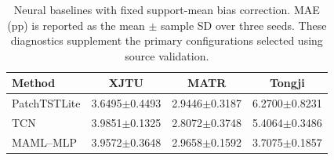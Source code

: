 \begin{table}[!htbp]\renewcommand{\arraystretch}{1.15}
\centering
\caption{Neural baselines with fixed support-mean bias correction. MAE (pp) is reported as the mean $\pm$ sample SD over three seeds. These diagnostics supplement the primary configurations selected using source validation.}
\label{tab:bias}
\papertablesize
\setlength{\tabcolsep}{4pt}
\begin{tabular}{lccc}
\toprule
Method & XJTU & MATR & Tongji \\
\midrule
PatchTSTLite & 3.6495$\pm$0.4493 & 2.9446$\pm$0.3187 & 6.2700$\pm$0.8231 \\
TCN & 3.9851$\pm$0.1325 & 2.8072$\pm$0.3748 & 5.4064$\pm$0.3486 \\
MAML--MLP & 3.9572$\pm$0.3648 & 2.9658$\pm$0.1592 & 3.7075$\pm$0.1857 \\
\bottomrule
\end{tabular}
\end{table}
